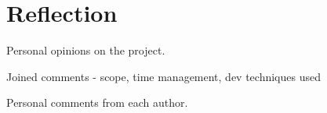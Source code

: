 \section{Reflection}
Personal opinions on the project.

Joined comments - scope, time management, dev techniques used

Personal comments from each author.

